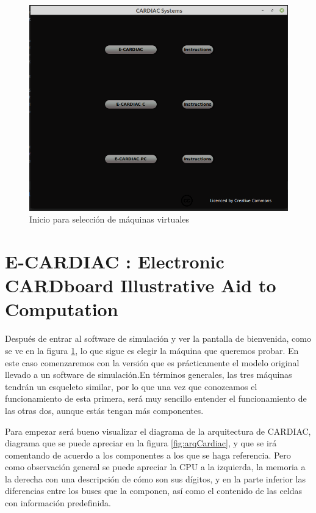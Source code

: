 \documentclass[letterpaper,12pt,oneside]{book}
\begin{document}
	
	\begin{figure}[h]
 			\centering
			\includegraphics[scale=0.5]{media/CARDIACC/WelcomeEC.png}
			\caption{Inicio para selección de máquinas virtuales}
			\label{fig:welcomeec}
	\end{figure}

	\clearpage
	\section{E-CARDIAC : Electronic CARDboard Illustrative Aid to Computation}
	
	Después de entrar al software de simulación y ver la pantalla de bienvenida, como se ve en la figura \ref{fig:welcomeec}, lo que sigue es elegir la máquina
	que queremos probar. En este caso comenzaremos con la versión que es prácticamente el modelo original
	llevado a un software de simulación.En términos
	generales, las tres máquinas tendrán un esqueleto similar, por lo que una vez que conozcamos el funcionamiento de esta primera, será muy sencillo
	entender el funcionamiento de las otras dos, aunque estás tengan más componentes.
 
    Para empezar será bueno visualizar el diagrama de la arquitectura de CARDIAC, diagrama 
	que se puede apreciar en la figura \ref{fig:arqCardiac}, y que se irá comentando de acuerdo a los componentes a los que se haga referencia. Pero
	como observación general se puede apreciar la CPU a la izquierda, la memoria a la derecha con una descripción de cómo son sus dígitos, y en la parte
	inferior las diferencias entre los buses que la componen, así como el contenido de las celdas con información predefinida.
\end{document}
